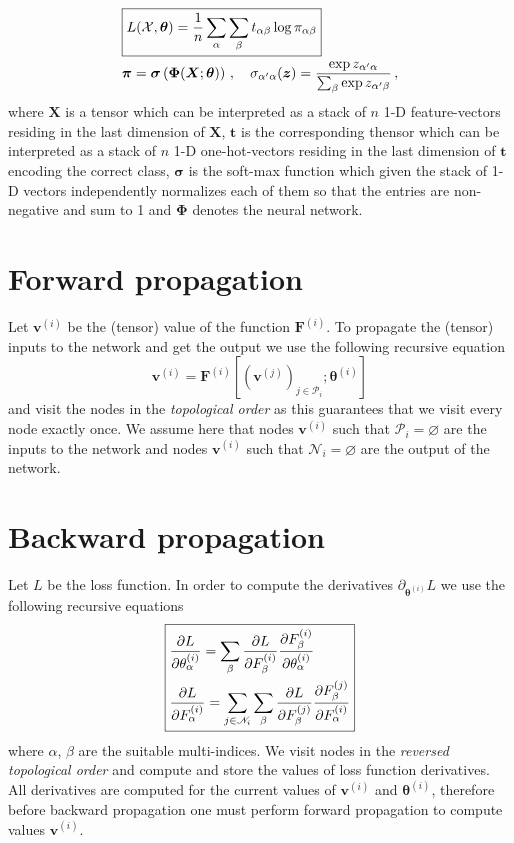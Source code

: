 \documentclass{myclass}
\begin{document}
\[\begin{split}
   &\boxed{L(\mathcal{X}, \bm{\theta}) = \frac{1}{n}\sum_{\alpha}\sum_{\beta} t_{\alpha\beta} \log \pi_{\alpha\beta}}\\
   & \bm{\pi} = \bm{\sigma}\left( \bm{\Phi}(\bm{X};\bm{\theta}) \right)\,,\quad \sigma_{\alpha'\alpha}(\bm{z}) = \frac{\exp z_{\alpha'\alpha}}{\sum_{\beta} \exp z_{\alpha'\beta}}\,,
\end{split}
\]
where \(\bm{X}\) is a tensor which can be interpreted as a stack of \(n\) 1-D feature-vectors residing in the last dimension of \(\bm{X}\), \(\bm{t}\) is the corresponding thensor which can be interpreted as a stack of \(n\) 1-D one-hot-vectors residing in the last dimension of \(\bm{t}\) encoding the correct class, \(\bm{\sigma}\) is the soft-max function which given the stack of 1-D vectors independently normalizes each of them so that the entries are non-negative and sum to 1 and \(\bm{\Phi}\) denotes the neural network.

\section{Forward propagation}

Let \(\bm{v}^{(i)}\) be the (tensor) value of the function \(\bm{F}^{(i)}\). To propagate the (tensor) inputs to the network and get the output we use the following recursive equation
\[\boxed{
   \bm{v}^{(i)} = \bm{F}^{(i)} \left[ \left(\bm{v}^{(j)}\right)_{j \in \mathscr{P}_i} ; \bm{\theta}^{(i)} \right]
}\]
and visit the nodes in the \emph{topological order} as this guarantees that we visit every node exactly once. We assume here that nodes \(\bm{v}^{(i)}\) such that \(\mathscr{P}_i = \varnothing\) are the inputs to the network and nodes \(\bm{v}^{(i)}\) such that \(\mathscr{N}_i = \varnothing\) are the output of the network.

\section{Backward propagation}

Let \(L\) be the loss function. In order to compute the derivatives \(\partial_{\bm{\theta}^{(i)}}L\) we use the following recursive equations
\[\boxed{\begin{split}
   &\pdv{L}{\theta^{(i)}_\alpha} = \sum_\beta \pdv{L}{F^{(i)}_\beta} \pdv{F^{(i)}_\beta}{\theta^{(i)}_\alpha} \\
   &\pdv{L}{F_\alpha^{(i)}} = \sum_{j \in \mathscr{N}_i} \sum_\beta \pdv{L}{F_\beta^{(j)}} \pdv{F_\beta ^{(j)}}{F_\alpha^{(i)}}
\end{split}
}\]
where \(\alpha\), \(\beta\) are the suitable multi-indices. We visit nodes in the \emph{reversed topological order} and compute and store the values of loss function derivatives. All derivatives are computed for the current values of \(\bm{v}^{(i)}\) and \(\bm{\theta}^{(i)}\), therefore before backward propagation one must perform forward propagation to compute values \(\bm{v}^{(i)}\).
\end{document}
